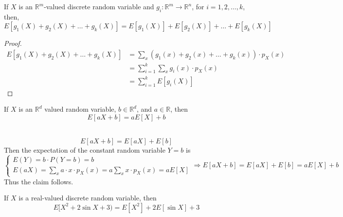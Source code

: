 \begin{theorem}
    If $X$ is an $\mathbb{R}^m$-valued discrete random variable and $g_i :
\mathbb{R}^m \rightarrow \mathbb{R}^n$, for $i = 1, 2, \dots, k$, then,
\begin{equation*}
    E[g_1(X) + g_2(X) + \dots + g_k(X)]
    = E[g_1(X)] + E[g_2(X)] + \dots + E[g_k(X)]
\end{equation*}
\end{theorem}
\begin{proof}
    \begin{align*}
           E[g_1(X) + g_2(X) + \dots + g_k(X)]
        &= \sum_{x} (g_1(x) + g_2(x) + \dots + g_k(x)) \cdot p_X(x)          \\
        &= \sum_{i = 1}^k \sum_{x} g_i(x) \cdot p_X(x)                       \\
        &= \sum_{i = 1}^k E[g_i(X)]
    \end{align*}
\end{proof}

\begin{theorem}
    If $X$ is an $\mathbb{R}^d$ valued random variable, $b \in \mathbb{R}^d$,
and $a \in \mathbb{R}$, then 
\begin{equation*}
    E[aX + b] = aE[X] + b
\end{equation*}
\end{theorem}
\begin{solution} \quad                                                       \\
    \begin{equation*}
        E[aX+b] = E[aX] + E[b]
    \end{equation*}
    Then the expectation of the constant random variable $Y = b$ is 
    \begin{equation*}
        \begin{cases}
            E(Y) = b \cdot P(Y = b) = b                                      \\
            E(aX) = \sum_{x} a \cdot x \cdot p_X(x) 
                  = a \sum_{x} x \cdot p_X(x)
                  = a E[X]
        \end{cases}
        \Rightarrow
        E[aX + b] = E[aX] + E[b] = aE[X] + b
    \end{equation*}
    Thus the claim follows.
\end{solution}

\begin{example}
    If $X$ is a real-valued discrete random variable, then
    \begin{equation*}
          E[X^2 + 2 \sin{X} + 3)
        = E[X^2] + 2 E[\sin{X}] + 3
    \end{equation*}
\end{example}